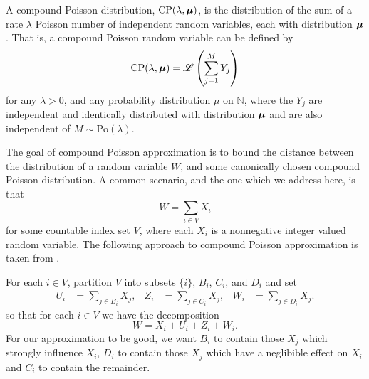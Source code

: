 	A compound Poisson distribution, $\mathrm{CP}(\lambda, {\bm{{\mu}}})$, is the distribution of the sum of a rate $\lambda$ Poisson number of independent random variables, each with distribution ${\bm{{\mu}}}$. That is, a compound Poisson random variable can be defined by
	\begin{equation}
		\mathrm{CP}(\lambda, {\bm{{\mu}}}) = \mathscr{L}\left(\sum_{j=1}^M Y_j\right)
	\end{equation}
	for any $\lambda > 0$, and any probability distribution $\mu$ on $\mathbb{N}$, where the $Y_j$ are independent and identically distributed with distribution ${\bm{{\mu}}}$ and are also independent of $M \sim \mathrm{Po}(\lambda)$.

	The goal of compound Poisson approximation is to bound the distance between the distribution of a random variable $W$, and some canonically chosen compound Poisson distribution. A common scenario, and the one which we address here, is that
	\begin{equation}
		W = \sum_{i \in V} X_i
	\end{equation}
	for some countable index set $V$, where each $X_i$ is a nonnegative integer valued random variable. The following approach to compound Poisson approximation is taken from \cite[Section 2.2]{Barbour2001-nh}.

	For each $i \in V$, partition $V$ into subsets $\{i\}$, $B_i$, $C_i$, and $D_i$ and set 
	\begin{align}
		U_i &= \sum_{j \in B_i} X_j, &
		Z_i &= \sum_{j \in C_i} X_j, &
		W_i &= \sum_{j \in D_i} X_j.
	\end{align}
	so that for each $i \in V$ we have the decomposition 
	\begin{equation}
		W = X_i + U_i + Z_i + W_i.
	\end{equation}
	For our approximation to be good, we want $B_i$ to contain those $X_j$ which strongly influence $X_i$, $D_i$ to contain those $X_j$ which have a neglibible effect on $X_i$ and $C_i$ to contain the remainder.


